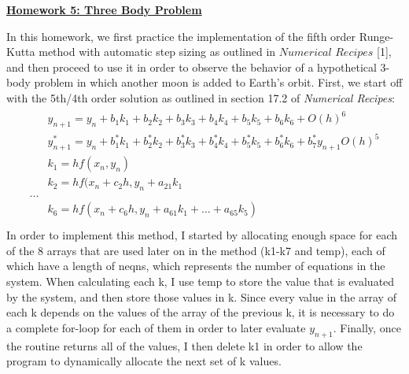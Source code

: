 \documentclass[11pt,letterpaper]{article}
\begin{document}
\begin{center}
\underline{\bf \large Homework 5: Three Body Problem}
\end{center}

In this homework, we first practice the implementation of the fifth order Runge-Kutta method with automatic step sizing as outlined in $\textit{Numerical Recipes}$ [1], and then proceed to use it in order to observe the behavior of a hypothetical 3-body problem in which another moon is added to Earth's orbit. First, we start off with the 5th/4th order solution as outlined in section 17.2 of \textit{Numerical Recipes}:
\begin{eqnarray}
\begin{aligned}
&y_{n+1} = y_{n} + b_1k_1 + b_2k_2 +b_3k_3 + b_4k_4 + b_5k_5 +b_6k_6 + O(h)^6\\
&y_{n+1}^* = y_{n} + b^*_1k_1 + b^*_2k_2 +b^*_3k_3 + b^*_4k_4 + b^*_5k_5 +b^*_6k_6 + b^*_7y_{n+1}O(h)^5\\
&k_1 = hf(x_n, y_n)\\
&k_2 = hf(x_n + c_2h, y_n + a_{21}k_1\\
...\\
&k_6 = hf(x_n + c_6h, y_n + a_{61}k_1 + ... + a_{65}k_5)\\
\end{aligned}
\end{eqnarray}
In order to implement this method, I started by allocating enough space for each of the 8 arrays that are used later on in the method (k1-k7 and temp), each of which have a length of neqns, which represents the number of equations in the system. When calculating each k, I use temp to store the value that is evaluated by the system, and then store those values in k. Since every value in the array of each k depends on the values of the array of the previous k, it is necessary to do a complete for-loop for each of them in order to later evaluate $y_{n+1}$. Finally, once the routine returns all of the values, I then delete k1 in order to allow the program to dynamically allocate the next set of k values.\\
\end{document}
